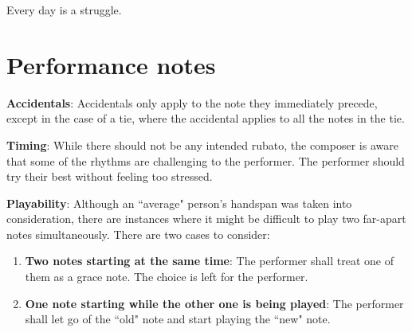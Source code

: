 \documentclass{article}
\begin{document}
Every day is a struggle.
\clearpage
\section*{Performance notes}
{\bfseries Accidentals}: Accidentals only apply to the note they
immediately precede, except in the case of a tie, where the accidental
applies to all the notes in the tie.

{\bfseries Timing}: While there should not be any intended rubato, the
composer is aware that some of the rhythms are challenging to the
performer. The performer should try their best without feeling too
stressed.

{\bfseries Playability}: Although an ``average" person's handspan was
taken into consideration, there are instances where it might be
difficult to play two far-apart notes simultaneously. There are two
cases to consider:
\begin{enumerate}
\item {\bfseries Two notes starting at the same time}: The performer
shall treat one of them as a grace note. The choice is left for the
performer.
\item {\bfseries One note starting while the other one is being played}:
The performer shall let go of the ``old" note and start playing the
``new" note.
\end{enumerate}
\end{document}
